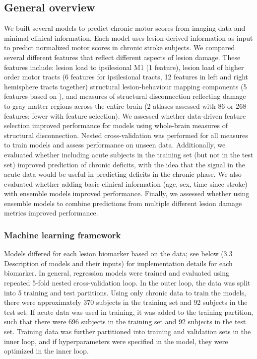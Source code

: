 \documentclass[phd,tocprelim]{cornell}
\begin{document}
\subsection{General overview}

We built several models to predict chronic motor scores from imaging data and minimal clinical information. Each model uses lesion-derived information as input to predict normalized motor scores in chronic stroke subjects. We compared several different features that reflect different aspects of lesion damage. These features include: lesion load to ipsilesional M1 (1 feature), lesion load of higher order motor tracts (6 features for ipsilesional tracts, 12 features in left and right hemisphere tracts together) structural lesion-behaviour mapping components (5 features based on \cite{Bowren2022-rs}), and measures of structural disconnection reflecting damage to gray matter regions across the entire brain (2 atlases assessed with 86 or 268 features; fewer with feature selection). We assessed whether data-driven feature selection improved performance for models using whole-brain measures of structural disconnection. Nested cross-validation was performed for all measures to train models and assess performance on unseen data.  Additionally, we evaluated whether including acute subjects in the training set (but not in the test set) improved prediction of chronic deficits, with the idea that the signal in the acute data would be useful in predicting deficits in the chronic phase. We also evaluated whether adding basic clinical information (age, sex, time since stroke) with ensemble models improved performance. Finally, we assessed whether using ensemble models to combine predictions from multiple different lesion damage metrics improved performance.

\subsubsection*{Machine learning framework}
Models differed for each lesion biomarker based on the data; see below (3.3 Description of models and their inputs) for implementation details for each biomarker. In general, regression models were trained and evaluated using repeated 5-fold nested cross-validation loop.  In the outer loop, the data was split into 5 training and test partitions. Using only chronic data to train the models, there were approximately 370 subjects in the training set and 92 subjects in the test set. If acute data was used in training, it was added to the training partition, such that there were 696 subjects in the training set and 92 subjects in the test set. Training data was further partitioned into training and validation sets in the inner loop, and if hyperparameters were specified in the model, they were optimized in the inner loop. 
\end{document}
